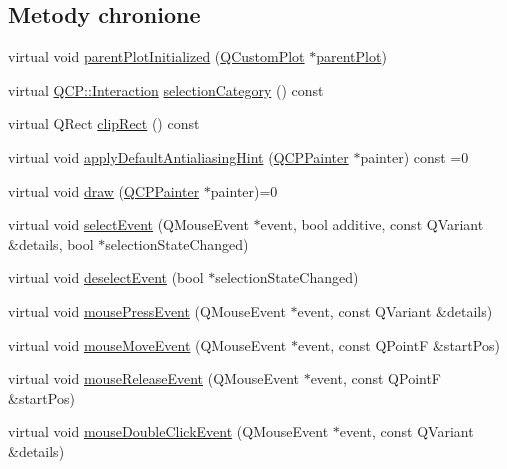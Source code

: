 \subsection*{Metody chronione}
\begin{DoxyCompactItemize}
\item 
virtual void \hyperlink{class_q_c_p_layerable_ab20b7dbd8e0249ed61adb9622c427382}{parent\+Plot\+Initialized} (\hyperlink{class_q_custom_plot}{Q\+Custom\+Plot} $\ast$\hyperlink{class_q_c_p_layerable_ab7e0e94461566093d36ffc0f5312b109}{parent\+Plot})
\item 
virtual \hyperlink{namespace_q_c_p_a2ad6bb6281c7c2d593d4277b44c2b037}{Q\+C\+P\+::\+Interaction} \hyperlink{class_q_c_p_layerable_aa4035e586b7f317a06ba7e74e242a5ea}{selection\+Category} () const 
\item 
virtual Q\+Rect \hyperlink{class_q_c_p_layerable_a07a8f746640c3704b09910df297afcba}{clip\+Rect} () const 
\item 
virtual void \hyperlink{class_q_c_p_layerable_afdf83ddc6a265cbf4c89fe99d3d93473}{apply\+Default\+Antialiasing\+Hint} (\hyperlink{class_q_c_p_painter}{Q\+C\+P\+Painter} $\ast$painter) const =0
\item 
virtual void \hyperlink{class_q_c_p_layerable_aecf2f7087482d4b6a78cb2770e5ed12d}{draw} (\hyperlink{class_q_c_p_painter}{Q\+C\+P\+Painter} $\ast$painter)=0
\item 
virtual void \hyperlink{class_q_c_p_layerable_a7498c2d0d081cf7cad0fb3bb93aa0e91}{select\+Event} (Q\+Mouse\+Event $\ast$event, bool additive, const Q\+Variant \&details, bool $\ast$selection\+State\+Changed)
\item 
virtual void \hyperlink{class_q_c_p_layerable_ae546370644a5551c76af739afc008bee}{deselect\+Event} (bool $\ast$selection\+State\+Changed)
\item 
virtual void \hyperlink{class_q_c_p_layerable_af6567604818db90f4fd52822f8bc8376}{mouse\+Press\+Event} (Q\+Mouse\+Event $\ast$event, const Q\+Variant \&details)
\item 
virtual void \hyperlink{class_q_c_p_layerable_a9eee1ba47fd69be111059ca3881933e4}{mouse\+Move\+Event} (Q\+Mouse\+Event $\ast$event, const Q\+PointF \&start\+Pos)
\item 
virtual void \hyperlink{class_q_c_p_layerable_aa0d79b005686f668622bbe66ac03ba2c}{mouse\+Release\+Event} (Q\+Mouse\+Event $\ast$event, const Q\+PointF \&start\+Pos)
\item 
virtual void \hyperlink{class_q_c_p_layerable_a4171e2e823aca242dd0279f00ed2de81}{mouse\+Double\+Click\+Event} (Q\+Mouse\+Event $\ast$event, const Q\+Variant \&details)

\end{DoxyCompactItemize}
